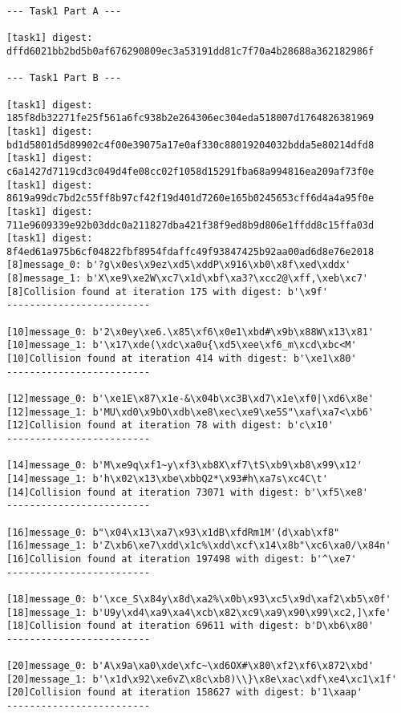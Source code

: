 \documentclass[11pt]{article}
\begin{document}
\begin{lstlisting}
--- Task1 Part A ---

[task1] digest: dffd6021bb2bd5b0af676290809ec3a53191dd81c7f70a4b28688a362182986f

--- Task1 Part B ---

[task1] digest: 185f8db32271fe25f561a6fc938b2e264306ec304eda518007d1764826381969
[task1] digest: bd1d5801d5d89902c4f00e39075a17e0af330c88019204032bdda5e80214dfd8
[task1] digest: c6a1427d7119cd3c049d4fe08cc02f1058d15291fba68a994816ea209af73f0e
[task1] digest: 8619a99dc7bd2c55ff8b97cf42f19d401d7260e165b0245653cff6d4a4a95f0e
[task1] digest: 711e9609339e92b03ddc0a211827dba421f38f9ed8b9d806e1ffdd8c15ffa03d
[task1] digest: 8f4ed61a975b6cf04822fbf8954fdaffc49f93847425b92aa00ad6d8e76e2018
[8]message_0: b'?g\x0es\x9ez\xd5\xddP\x916\xb0\x8f\xed\xddx'
[8]message_1: b'X\xe9\xe2W\xc7\x1d\xbf\xa3?\xcc2@\xff,\xeb\xc7'
[8]Collision found at iteration 175 with digest: b'\x9f'
-------------------------

[10]message_0: b'2\x0ey\xe6.\x85\xf6\x0e1\xbd#\x9b\x88W\x13\x81'
[10]message_1: b'\x17\xde(\xdc\xa0u{\xd5\xee\xf6_m\xcd\xbc<M'
[10]Collision found at iteration 414 with digest: b'\xe1\x80'
-------------------------

[12]message_0: b'\xe1E\x87\x1e-&\x04b\xc3B\xd7\x1e\xf0|\xd6\x8e'
[12]message_1: b'MU\xd0\x9bO\xdb\xe8\xec\xe9\xe5S"\xaf\xa7<\xb6'
[12]Collision found at iteration 78 with digest: b'c\x10'
-------------------------

[14]message_0: b'M\xe9q\xf1~y\xf3\xb8X\xf7\tS\xb9\xb8\x99\x12'
[14]message_1: b'h\x02\x13\xbe\xbbQ2*\x93#h\xa7s\xc4C\t'
[14]Collision found at iteration 73071 with digest: b'\xf5\xe8'
-------------------------

[16]message_0: b"\x04\x13\xa7\x93\x1dB\xfdRm1M'(d\xab\xf8"
[16]message_1: b'Z\xb6\xe7\xdd\x1c%\xdd\xcf\x14\x8b"\xc6\xa0/\x84n'
[16]Collision found at iteration 197498 with digest: b'^\xe7'
-------------------------

[18]message_0: b'\xce_S\x84y\x8d\xa2%\x0b\x93\xc5\x9d\xaf2\xb5\x0f'
[18]message_1: b'U9y\xd4\xa9\xa4\xcb\x82\xc9\xa9\x90\x99\xc2,]\xfe'
[18]Collision found at iteration 69611 with digest: b'D\xb6\x80'
-------------------------

[20]message_0: b'A\x9a\xa0\xde\xfc~\xd6OX#\x80\xf2\xf6\x872\xbd'
[20]message_1: b'\x1d\x92\xe6vZ\x8c\xb8)\\}\x8e\xac\xdf\xe4\xc1\x1f'
[20]Collision found at iteration 158627 with digest: b'1\xaap'
-------------------------


\end{lstlisting}
\end{document}
